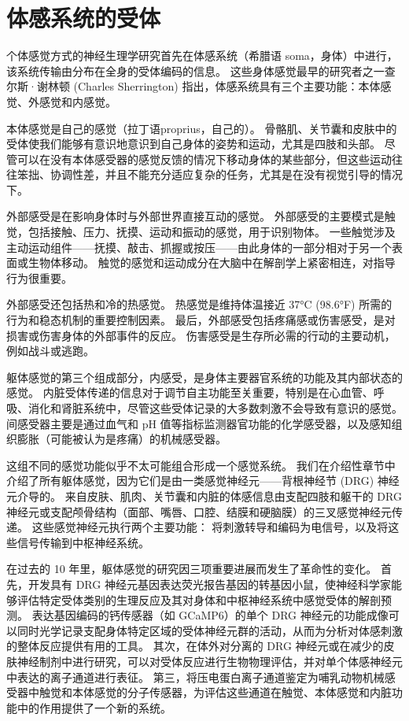 \chapter{体感系统的受体} \label{chap:chap18}

个体感觉方式的神经生理学研究首先在体感系统（希腊语 soma，身体）中进行，该系统传输由分布在全身的受体编码的信息。
这些身体感觉最早的研究者之一查尔斯·谢林顿 (Charles Sherrington) 指出，体感系统具有三个主要功能：本体感觉、外感觉和内感觉。


本体感觉是自己的感觉（拉丁语proprius，自己的）。
骨骼肌、关节囊和皮肤中的受体使我们能够有意识地意识到自己身体的姿势和运动，尤其是四肢和头部。
尽管可以在没有本体感受器的感觉反馈的情况下移动身体的某些部分，但这些运动往往笨拙、协调性差，并且不能充分适应复杂的任务，尤其是在没有视觉引导的情况下。


外部感受是在影响身体时与外部世界直接互动的感觉。
外部感受的主要模式是触觉，包括接触、压力、抚摸、运动和振动的感觉，用于识别物体。
一些触觉涉及主动运动组件——抚摸、敲击、抓握或按压——由此身体的一部分相对于另一个表面或生物体移动。
触觉的感觉和运动成分在大脑中在解剖学上紧密相连，对指导行为很重要。


外部感受还包括热和冷的热感觉。
热感觉是维持体温接近 37°C (98.6°F) 所需的行为和稳态机制的重要控制因素。
最后，外部感受包括疼痛感或伤害感受，是对损害或伤害身体的外部事件的反应。
伤害感受是生存所必需的行动的主要动机，例如战斗或逃跑。


躯体感觉的第三个组成部分，内感受，是身体主要器官系统的功能及其内部状态的感觉。
内脏受体传递的信息对于调节自主功能至关重要，特别是在心血管、呼吸、消化和肾脏系统中，尽管这些受体记录的大多数刺激不会导致有意识的感觉。
间感受器主要是通过血气和 pH 值等指标监测器官功能的化学感受器，以及感知组织膨胀（可能被认为是疼痛）的机械感受器。


这组不同的感觉功能似乎不太可能组合形成一个感觉系统。
我们在介绍性章节中介绍了所有躯体感觉，因为它们是由一类感觉神经元——背根神经节 (DRG) 神经元介导的。
来自皮肤、肌肉、关节囊和内脏的体感信息由支配四肢和躯干的 DRG 神经元或支配颅骨结构（面部、嘴唇、口腔、结膜和硬脑膜）的三叉感觉神经元传递。
这些感觉神经元执行两个主要功能：
将刺激转导和编码为电信号，以及将这些信号传输到中枢神经系统。


在过去的 10 年里，躯体感觉的研究因三项重要进展而发生了革命性的变化。 
首先，开发具有 DRG 神经元基因表达荧光报告基因的转基因小鼠，使神经科学家能够评估特定受体类别的生理反应及其对身体和中枢神经系统中感觉受体的解剖预测。
表达基因编码的钙传感器（如 GCaMP6）的单个 DRG 神经元的功能成像可以同时光学记录支配身体特定区域的受体神经元群的活动，从而为分析对体感刺激的整体反应提供有用的工具。
其次，在体外对分离的 DRG 神经元或在减少的皮肤神经制剂中进行研究，可以对受体反应进行生物物理评估，并对单个体感神经元中表达的离子通道进行表征。
第三，将压电蛋白离子通道鉴定为哺乳动物机械感受器中触觉和本体感觉的分子传感器，为评估这些通道在触觉、本体感觉和内脏功能中的作用提供了一个新的系统。


